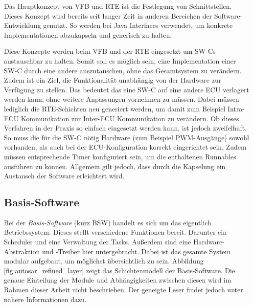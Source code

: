 \documentclass[
  a4paper,					    %
  twoside,
  DIV=calc,     				%
  bibliography=totoc,
  cleardoublepage=empty,
  ngerman,     					%
  final       					%
]{scrbook}
\begin{document}
Das Hauptkonzept von VFB und RTE ist die Festlegung von Schnittstellen. Dieses Konzept wird bereits seit langer Zeit in anderen Bereichen der Software-Entwicklung genutzt. So werden bei Java Interfaces verwendet, um konkrete Implementationen abzukapseln und generisch zu halten.\cite{objektorientierung}

Diese Konzepte werden beim VFB und der RTE eingesetzt um SW-Cs austauschbar zu halten. Somit soll es möglich sein, eine Implementation einer SW-C durch eine andere auszutauschen, ohne das Gesamtsystem zu verändern. Zudem ist ein Ziel, die Funktionalität unabhängig von der Hardware zur Verfügung zu stellen. Das bedeutet das eine SW-C auf eine andere ECU verlagert werden kann, ohne weitere Anpassungen vornehmen zu müssen. Dabei müssen lediglich die RTE-Schichten neu generiert werden, um damit zum Beispiel Intra-ECU Kommunikation zur Inter-ECU Kommunikation zu verändern. Ob dieses Verfahren in der Praxis so einfach eingesetzt werden kann, ist jedoch zweifelhaft. So muss die für die SW-C nötig Hardware (zum Beispiel PWM-Ausgänge) sowohl vorhanden, als auch bei der ECU-Konfiguration korrekt eingerichtet sein. Zudem müssen entsprechende Timer konfiguriert sein, um die enthaltenen Runnables ausführen zu können. Allgemein gilt jedoch, dass durch die Kapselung ein Austausch der Software erleichtert wird.








\subsection{Basis-Software}
\label{sec:bsw}
Bei der \emph{Basis-Software} (kurz BSW) handelt es sich um das eigentlich Betriebssystem. Dieses stellt verschiedene Funktionen bereit. Darunter ein Scheduler und eine Verwaltung der Tasks. Außerdem sind eine Hardware-Abstraktion und -Treiber hier untergebracht. Dabei ist das gesamte System modular aufgebaut, um möglichst übersichtlich zu sein. Abbildung \ref{fig:autosar_refined_layer} zeigt das Schichtenmodell der Basis-Software. Die genaue Einteilung der Module und Abhängigkeiten zwischen diesen wird im Rahmen dieser Arbeit nicht beschrieben. Der geneigte Leser findet jedoch unter \cite{autosar_layer} nähere Informationen dazu.
\end{document}
